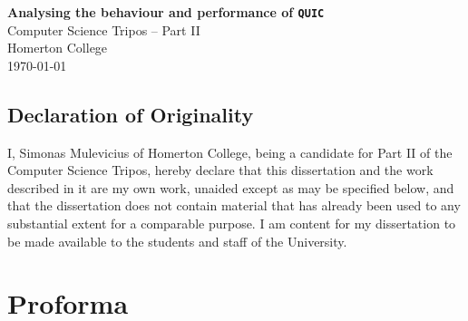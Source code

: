 \documentclass[12pt,a4paper,twoside,openright]{report}
\begin{document}




\pagestyle{empty}


\vspace*{60mm}
\begin{center}
\Huge
\textbf{Analysing the behaviour and performance of \texttt{QUIC}} \\[5mm]
Computer Science Tripos -- Part II \\[5mm]
Homerton College \\[5mm]
\today  %
\end{center}








\newpage



\section*{Declaration of Originality}

I, Simonas Mulevicius of Homerton College, being a candidate for Part II of the Computer
Science Tripos, hereby declare
that this dissertation and the work described in it are my own work,
unaided except as may be specified below, and that the dissertation
does not contain material that has already been used to any substantial
extent for a comparable purpose. I am content for my dissertation to
be made available to the students and staff of the University.

\bigskip
{}

\medskip
{}


\newpage











\pagestyle{plain}

\chapter*{Proforma}
\end{document}

